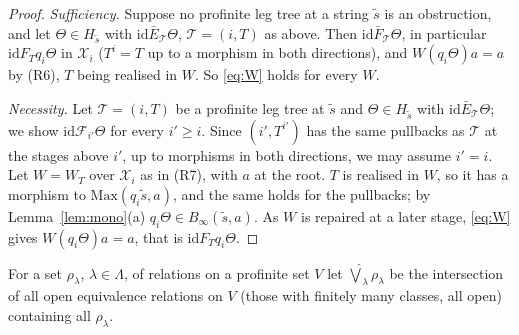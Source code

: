 \documentclass[11pt]{amsart}
\theoremstyle{definition}
\newcommand{\cX}{\mathcal X}
\newcommand{\id}{\mathrm{id}}
\begin{document}
\begin{proof}
\emph{Sufficiency.} Suppose no profinite leg tree at a string $\tilde
s$ is an obstruction, and let $\Theta\in H_{\tilde s}$ with $\id
\mathrel{\bar E_{\mathcal T}}\Theta$, $\mathcal T=(i,T)$ as above.
Then $\id\mathrel{\bar F_{\mathcal T}}\Theta$, in particular $\id
\mathrel{F_T}q_i\Theta$ in $\cX_i$ ($T^i=T$ up to a morphism in both
directions), and $W(q_i\Theta)a=a$ by (R6), $T$ being realised in $W$.
So \eqref{eq:W} holds for every $W$.

\emph{Necessity.} Let $\mathcal T=(i,T)$ be a profinite leg tree at
$\tilde s$ and $\Theta\in H_{\tilde s}$ with $\id\mathrel{\bar
E_{\mathcal T}}\Theta$; we show $\id\mathrel{\mathcal F_{i'}}\Theta$
for every $i'\ge i$. Since $(i',T^{i'})$ has the same pullbacks as
$\mathcal T$ at the stages above $i'$, up to morphisms in both
directions, we may assume $i'=i$. Let $W=W_T$ over $\cX_i$ as in (R7),
with $a$ at the root. $T$ is realised in $W$, so it has a morphism to
$\mathrm{Max}(q_i\tilde s,a)$, and the same holds for the pullbacks;
by Lemma~\ref{lem:mono}(a) $q_i\Theta\in B_\infty(\tilde s,a)$. As $W$
is repaired at a later stage, \eqref{eq:W} gives $W(q_i\Theta)a=a$,
that is $\id\mathrel{F_T}q_i\Theta$.
\end{proof}

For a set $\rho_\lambda$, $\lambda\in\Lambda$, of relations on a
profinite set $V$ let $\widehat\bigvee_\lambda\rho_\lambda$ be the
intersection of all open equivalence relations on $V$ (those with
finitely many classes, all open) containing all $\rho_\lambda$.
\end{document}
